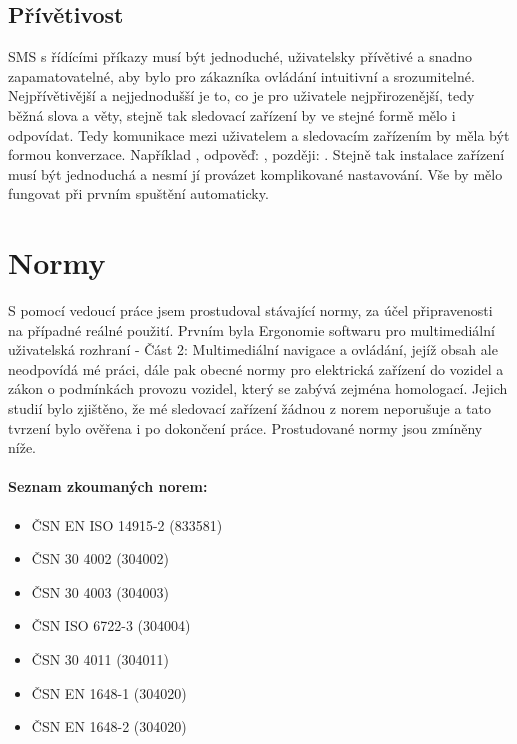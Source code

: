 \documentclass[FM,BP]{tulthesis}  %
\begin{document}
\subsection{Přívětivost}
SMS s řídícími příkazy musí být jednoduché, uživatelsky přívětivé a snadno zapamatovatelné, aby bylo pro zákazníka ovládání intuitivní a srozumitelné. Nejpřívětivější a nejjednodušší je to, co je pro uživatele nejpřirozenější, tedy běžná slova a věty, stejně tak sledovací zařízení by ve stejné formě mělo i odpovídat. Tedy komunikace mezi uživatelem a sledovacím zařízením by měla být formou konverzace. Například , odpověď: , později: . Stejně tak instalace zařízení musí být jednoduchá a nesmí jí provázet komplikované nastavování. Vše by mělo fungovat při prvním spuštění automaticky.

\section{Normy}
S pomocí vedoucí práce jsem prostudoval stávající normy, za účel připravenosti na případné reálné použití. Prvním byla Ergonomie softwaru pro multimediální uživatelská rozhraní - Část 2: Multimediální navigace a ovládání, jejíž obsah ale neodpovídá mé práci, dále pak obecné normy pro elektrická zařízení do vozidel a zákon o podmínkách provozu vozidel, který se zabývá zejména homologací. Jejich studií bylo zjištěno, že mé sledovací zařízení žádnou z norem neporušuje a tato tvrzení bylo ověřena i po dokončení práce. Prostudované normy jsou zmíněny níže.

\paragraph{Seznam zkoumaných norem:}
\begin{itemize}
\item ČSN EN ISO 14915-2 (833581)
\item ČSN 30 4002 (304002)
\item ČSN 30 4003 (304003)
\item ČSN ISO 6722-3 (304004)
\item ČSN 30 4011 (304011)
\item ČSN EN 1648-1 (304020)
\item ČSN EN 1648-2 (304020)
\end{itemize} 

\end{document}
